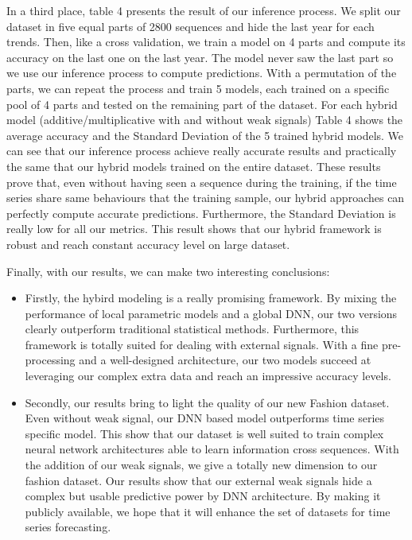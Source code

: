 \documentclass{article} %
\begin{document}
In a third place, table 4 presents the result of our inference process. We split our dataset in five equal parts of 2800 sequences and hide the last year for each trends. Then, like a cross validation, we train a model on 4 parts and compute its accuracy on the last one on the last year. The model never saw the last part so we use our inference process to compute predictions. With a permutation of the parts, we can repeat the process and train 5 models, each trained on a specific pool of 4 parts and tested on the remaining part of the dataset. For each hybrid model (additive/multiplicative with and without weak signals) Table 4 shows the average accuracy and the Standard Deviation of the 5 trained hybrid models. We can see that our inference process achieve really accurate results and practically the same that our hybrid models trained on the entire dataset. These results prove that, even without having seen a sequence during the training, if the time series share same behaviours that the training sample, our hybrid approaches can perfectly compute accurate predictions. Furthermore, the Standard Deviation is really low for all our metrics. This result shows that our hybrid framework is robust and reach constant accuracy level on large dataset.


Finally, with our results, we can make two interesting conclusions: 
\begin{itemize}
    \item Firstly, the hybird modeling is a really promising framework. By mixing the performance of local parametric models and a global DNN, our two versions clearly outperform traditional statistical methods. Furthermore, this framework is totally suited for dealing with external signals. With a fine pre-processing and a well-designed architecture, our two models succeed at leveraging our complex extra data and reach an impressive accuracy levels.
    \item Secondly, our results bring to light the quality of our new Fashion dataset. Even without weak signal, our DNN based model outperforms time series specific model. This show that our dataset is well suited to train complex neural network architectures able to learn information cross sequences. With the addition of our weak signals, we give a totally new dimension to our fashion dataset. Our results show that our external weak signals hide a complex but usable predictive power by DNN architecture. By making it publicly available, we hope that it will enhance the set of datasets for time series forecasting.
\end{itemize} 
\end{document}
